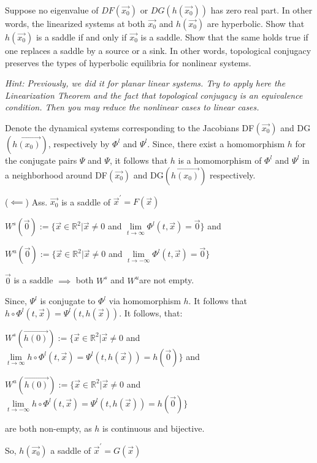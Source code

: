 \documentclass{article}
\begin{document}
Suppose no eigenvalue of $DF(\vec{x_0})$ or $DG(
h(\vec{x_0}))$ has zero real part. In other
words, the linearized systems at both $\vec{x_0}$ and $h(\vec{x_0})$ are hyperbolic.
Show that $h(\vec{x_0})$ is a saddle if and only if $\vec{x_0}$ is a saddle. Show that the same
holds true if one replaces a saddle by a source or a sink. In other words, topological
conjugacy preserves the types of hyperbolic equilibria for nonlinear systems.

\textit{Hint: Previously, we did it for planar linear systems. Try to apply here the Linearization Theorem and the fact that topological conjugacy is an equivalence condition.
  Then you may reduce the nonlinear cases to linear cases.}

\vspace{0.618 em}

Denote the dynamical systems corresponding to the Jacobians
DF$(\vec{x_0})$ and DG$(\vec{h(x_0)})$, respectively by $\Phi^l$ and
$\Psi^l$. Since, there exist a homomorphism $h$ for the conjugate
pairs $\Psi$ and $\Psi$, it follows that $h$ is a homomorphism of $\Phi^l$ and
$\Psi^l$ in a neighborhood around DF$(\vec{x_0})$ and DG$(\vec{h(x_0)})$ respectively.

($\impliedby$) Ass. $\vec{x_0}$ is a saddle of $\vec{x}^\prime = F(\vec{x})$

$W^s(\vec{0}) := \{\vec{x}\in \mathbb{R}^2| \vec{x} \neq
0$ and $\lim\limits_{t\rightarrow \infty}\Phi^l(t, \vec{x}) = \vec{0}\}$
and

$W^u(\vec{0}) := \{\vec{x}\in \mathbb{R}^2| \vec{x} \neq
0$ and $\lim\limits_{t\rightarrow -\infty}\Phi^l(t, \vec{x}) =
\vec{0}\}$


$\vec{0}$ is a saddle $\implies$ both  $W^s$ and $W^u$are not empty.

Since, $\Psi^l$ is conjugate to $\Phi^l$ via homomorphism $h$. It follows
that
$h\circ\Phi^l(t,\vec{x}) = \Psi^l(t,h(\vec{x}))$. It follows, that:

$W^s(\vec{h(0)}) := \{\vec{x}\in \mathbb{R}^2| \vec{x} \neq
0$ and $\lim\limits_{t\rightarrow \infty}h\circ\Phi^l(t, \vec{x})
= \Psi^l(t,h(\vec{x})) = h(\vec{0})\}$
and

$W^u(\vec{h(0)}) := \{\vec{x}\in \mathbb{R}^2| \vec{x} \neq
0$ and $\lim\limits_{t\rightarrow -\infty} h\circ\Phi^l(t, \vec{x}) =\Psi^l(t,h(\vec{x}))
= h(\vec{0})\}$

are both non-empty, as $h$ is continuous and bijective.

So, $h(\vec{x_0})$ a saddle of $\vec{x}^\prime = G(\vec{x})$
\end{document}
